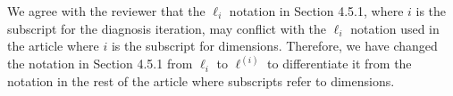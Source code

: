 \documentclass[11pt]{report}
\begin{document}
We agree with the reviewer that the $\ell_i$ notation in Section 4.5.1, where $i$ is the subscript for the diagnosis iteration, may conflict with the $\ell_i$ notation used in the article where $i$ is the subscript for dimensions. Therefore, we have changed the notation in Section 4.5.1 from $\ell_i$ to $\ell^{(i)}$ to differentiate it from the notation in the rest of the article where subscripts refer to dimensions.






\end{document}
